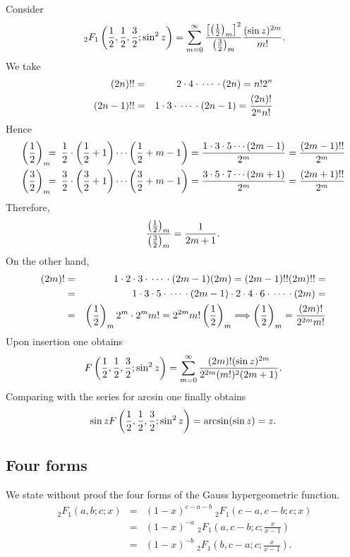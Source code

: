 {\begin{enumerate}
Consider
$$
   {\;}_2F_1\left({1\over 2},{1\over 2},{3\over 2};\sin^2z\right)=
   \sum_{m=0}^\infty{\left[\left({1\over 2}\right)_m\right]^2\over
   \left({3\over 2}\right)_m}{(\sin z)^{2m}\over m!}.
$$
We take
\begin{eqnarray*}
   (2n)!!&=& 2\cdot4\cdot\,\cdots\,\cdot(2n)=n!2^n\\
   (2n-1)!!&=& 1\cdot3\cdot\,\cdots\,\cdot(2n-1)={(2n)!\over2^n n!}
\end{eqnarray*}
Hence
\begin{eqnarray*}
   \left({1\over 2}\right)_m\!\!\!&=\!\!\!&{1\over 2}\cdot
   \left({1\over 2}+1\right)\cdots\left({1\over 2}+m-1\right)=
   {1\cdot3\cdot5\cdots(2m-1)\over2^m}={(2m-1)!!\over2^m}\\
   \left({3\over 2}\right)_m\!\!\!&=\!\!\!&{3\over 2}\cdot
   \left({3\over 2}+1\right)\cdots\left({3\over 2}+m-1\right)=
   {3\cdot5\cdot7\cdots(2m+1)\over2^m}={(2m+1)!!\over2^m}
\end{eqnarray*}
Therefore,
$$
   {\left({1\over 2}\right)_m\over\left({3\over 2}\right)_m}=
   {1\over 2m+1}.
$$
On the other hand,
\begin{eqnarray*}
   (2m)!&=&1\cdot2\cdot3\cdot\,\cdots\,\cdot(2m-1)(2m)=(2m-1)!!(2m)!!=\\
        &=&1\cdot3\cdot5\cdot\,\cdots\,\cdot(2m-1)\cdot
           2\cdot4\cdot6\cdot\,\cdots\,\cdot(2m)=\\
        &=&\left({1\over 2}\right)_m2^m\cdot2^m m!=2^{2m}m!
           \left({1\over 2}\right)_m
   \Longrightarrow\left({1\over 2}\right)_m={(2m)!\over 2^{2m}m!}
\end{eqnarray*}
Upon insertion one obtains
$$
   F\left({1\over 2},{1\over 2},{3\over 2};\sin^2z\right)=
   \sum_{m=0}^\infty{(2m)!(\sin z)^{2m}\over 2^{2m}(m!)^2(2m+1)}.
$$
Comparing with the series for arcsin one finally obtains
$$
   \sin z F\left({1\over 2},{1\over 2},{3\over 2};\sin^2z\right)=
   \arcsin(\sin z)=z.
$$
\end{enumerate}
\eexample
}

\subsection{Four forms}


We state without proof the four forms of the
Gauss hypergeometric function.\cite{macrobert:1967:she}
\begin{eqnarray}
{\;}_2F_1(a,b;c;x)
&=&(1-x)^{c-a-b}{\;}_2F_1(c-a,c-b;c;x)\\
&=&(1-x)^{ -a }{\;}_2F_1\left( a,c-b;c;\frac{x}{x-1}\right)\\
&=&(1-x)^{ -b }{\;}_2F_1\left( b,c-a;c;\frac{x}{x-1}\right).
\end{eqnarray}


